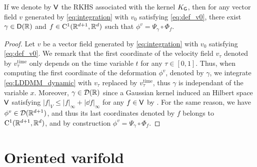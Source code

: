\begin{lemma}
  If we denote by $\mathsf{V}$ the RKHS associated with the kernel $K_{\mathsf{G}}$, then for any vector field $v$ generated by \eqref{eq:integration} with $v_0$ satisfying \eqref{eq:def_v0},
   there exist $\gamma \in \mathsf{D}(\mathbb{R}) $ and $f\in \mathrm{C}^1(\mathbb{R}^{d+1},\mathbb{R}^d)$ such that $\phi^v=\Psi_\gamma\circ\Phi_f $.
\end{lemma}
\begin{proof}
  Let $v$ be a vector field generated by \eqref{eq:integration} with $v_0$ satisfying \eqref{eq:def_v0}.
 We remark that the first coordinate of the velocity field $v_\tau$ denoted by $v_\tau^{\text{time}}$ only depends on the time variable $t$ for any $\tau\in[0,1]$.
 Thus, when computing the first coordinate of the deformation $\phi^v$, denoted by $\gamma$, we integrate \eqref{eq:LDDMM_dynamic} with $v_\tau$ replaced by $v_\tau^{\text{time}}$,
  thus $\gamma$ is independant of the variable $x$. Moreover, $\gamma\in \mathcal{D}(\mathbb{R})$ since a Gaussian kernel induced an Hilbert space $\mathsf{V}$ satisfying $|f|_V\leq |f|_\infty+ |\dd f|_\infty  $ for any $f\in \mathsf{V}$ by \citep[Theorem 9]{glaunes2005transport}.
  For the same reason, we have $\phi^v\in \mathcal{D}(\mathbb{R}^{d+1})$, and thus its last coordinates denoted by $f$ belongs to $\mathrm{C}^1(\mathbb{R}^{d+1},\mathbb{R}^d)$, and by construction $\phi^v=\Psi_\gamma\circ\Phi_f $.
\end{proof}




\section{Oriented varifold}

